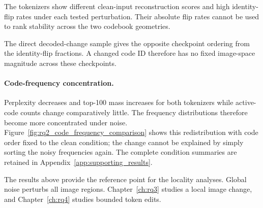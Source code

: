 The tokenizers show different clean-input reconstruction scores and high
identity-flip rates under each tested perturbation. Their absolute flip rates
cannot be used to rank stability across the two codebook geometries.

The direct decoded-change sample gives the opposite checkpoint ordering from
the identity-flip fractions. A changed code ID therefore has no fixed
image-space magnitude across these checkpoints.

\paragraph{Code-frequency concentration.}
\label{subsec:rq2_noise_concentrates_usage}

Perplexity decreases and top-100 mass increases for both tokenizers while
active-code counts change comparatively little. The frequency distributions
therefore become more concentrated under noise. Figure~\ref{fig:rq2_code_frequency_comparison}
shows this redistribution with code order fixed to the clean condition;
the change cannot be explained by simply sorting the noisy frequencies again.
The complete condition summaries are retained in
Appendix~\ref{app:supporting_results}.

The results above provide the reference point for the locality analyses. Global
noise perturbs all image regions. Chapter~\ref{ch:rq3} studies a local image
change, and Chapter~\ref{ch:rq4} studies bounded token edits.
